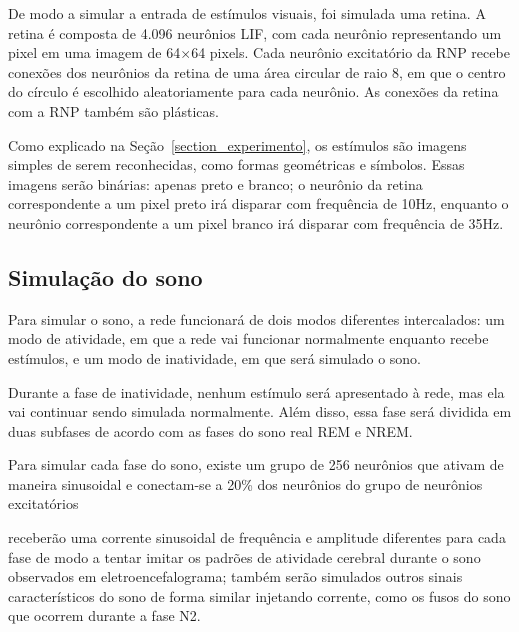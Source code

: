 De modo a simular a entrada de estímulos visuais, foi simulada uma retina. A retina é composta de 4.096 neurônios LIF, com cada
neurônio representando um pixel em uma imagem de 64$\times$64 pixels. Cada neurônio excitatório da RNP recebe conexões dos
neurônios da retina de uma área circular de raio 8, em que o centro do círculo é escolhido aleatoriamente para cada neurônio. As
conexões da retina com a RNP também são plásticas.

Como explicado na Seção~\ref{section_experimento}, os estímulos são imagens simples de serem reconhecidas, como formas
geométricas e símbolos. Essas imagens serão binárias: apenas preto e branco; o neurônio da retina correspondente a um pixel preto
irá disparar com frequência de 10Hz, enquanto o neurônio correspondente a um pixel branco irá disparar com frequência de 35Hz.

\subsection{Simulação do sono}\label{subsection_sono}

Para simular o sono, a rede funcionará de dois modos diferentes intercalados: um modo de atividade, em que a rede vai funcionar
normalmente enquanto recebe estímulos, e um modo de inatividade, em que será simulado o sono. 

Durante a fase de inatividade, nenhum estímulo será apresentado à rede, mas ela vai continuar sendo simulada normalmente. Além
disso, essa fase será dividida em duas subfases de acordo com as fases do sono real REM e NREM. 


Para simular cada fase do sono, existe um grupo de 256 neurônios que ativam de maneira sinusoidal e conectam-se a 20\% dos
neurônios do grupo de neurônios excitatórios

receberão uma corrente sinusoidal de frequência e amplitude diferentes para cada fase de modo a tentar imitar os padrões de
atividade cerebral durante o sono observados em eletroencefalograma; também serão simulados outros sinais característicos do sono
de forma similar injetando corrente, como os fusos do sono que ocorrem durante a fase N2.




